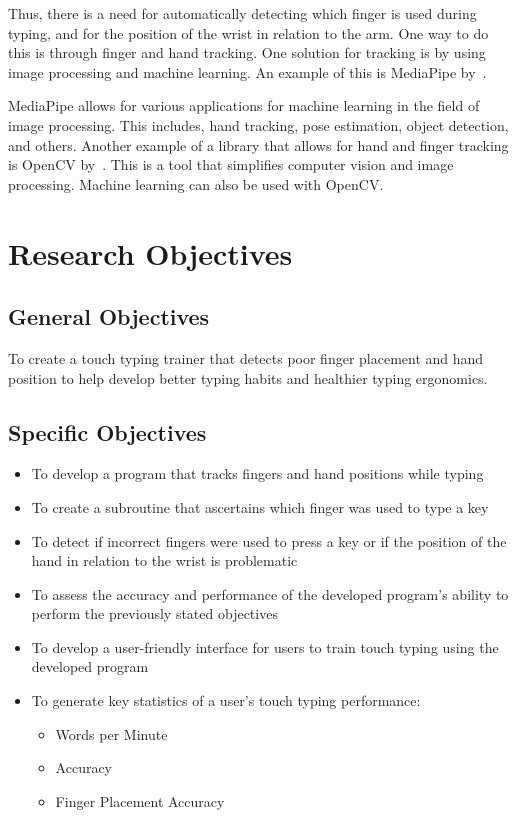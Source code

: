 \documentclass{report}
\begin{document}
Thus, there is a need for automatically detecting which finger is used during
typing, and for the position of the wrist in relation to the arm. One way to do
this is through finger and hand tracking. One solution for tracking is by using
image processing and machine learning. An example of this is MediaPipe
by~\cite{mediapipe}.

MediaPipe allows for various applications for machine learning in the field of
image processing. This includes, hand tracking, pose estimation, object
detection, and others. Another example of a library that allows for hand and
finger tracking is OpenCV by~\cite{opencv}. This is a tool that simplifies
computer vision and image processing. Machine learning can also be used with
OpenCV.

\section{Research Objectives}

\subsection{General Objectives}
To create a touch typing trainer that detects poor finger placement and hand
position to help develop better typing habits and healthier typing ergonomics.

\subsection{Specific Objectives}
\begin{itemize}
	\item To develop a program that tracks fingers and hand positions while typing
	\item To create a subroutine that ascertains which finger was used to type a key
	\item To detect if incorrect fingers were used to press a key or if the
	      position of the hand in relation to the wrist is problematic
	\item To assess the accuracy and performance of the developed program's ability
	      to perform the previously stated objectives
	\item To develop a user-friendly interface for users to train touch typing
	      using the developed program
	\item To generate key statistics of a user's touch typing performance:
	      \begin{itemize}
		      \item Words per Minute
		      \item Accuracy
		      \item Finger Placement Accuracy
	      \end{itemize}
\end{itemize}
\end{document}
